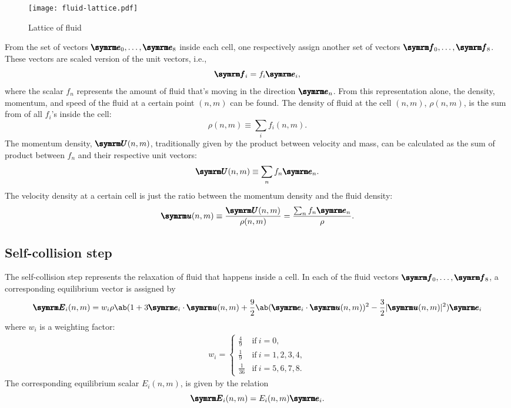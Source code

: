 \begin{figure}[ht]
	\centering
	\texttt{[image: fluid-lattice.pdf]}
	\caption{Lattice of fluid}
	\label{fig:fluid-lattice}
\end{figure}

From the set of vectors $\vv{e}_0, \dots, \vv{e}_8$ inside each cell, one respectively assign another set of vectors $\vv{f}_0, \dots, \vv{f}_8$. These vectors are scaled version of the unit vectors, i.e.,
\begin{equation}
	\vv{f}_i = f_i\vv{e}_i,
\end{equation}
where the scalar $f_n$ represents the amount of fluid that's moving in the direction $\vv{e}_n$. From this representation alone, the density, momentum, and speed of the fluid at a certain point $(n, m)$ can be found. The density of fluid at the cell $(n, m)$, $\rho(n, m)$, is the sum from of all $f_i$'s inside the cell:
\begin{equation}
	\rho(n, m) \equiv \sum_if_i(n, m).
\end{equation}
The momentum density, $\vv{U}(n, m)$, traditionally given by the product between velocity and mass, can be calculated as the sum of product between $f_n$ and their respective unit vectors:
\begin{equation}
	\vv{U}(n, m) \equiv \sum_nf_n\vv{e}_n.
\end{equation}
The velocity density at a certain cell is just the ratio between the momentum density and the fluid density:
\begin{equation}
	\vv{u}(n, m) \equiv \frac{\vv{U}(n, m)}{\rho(n, m)} = \frac{\sum_nf_n\vv{e}_n}{\rho}.
\end{equation}

\subsection{Self-collision step}

The self-collision step represents the relaxation of fluid that happens inside a cell. In each of the fluid vectors $\vv{f}_0,\dots,\vv{f}_8$, a corresponding equilibrium vector is assigned by
\begin{equation}
	\vv{E}_i(n, m) = w_i\rho\ab(1 + 3\vv{e}_i \cdot \vv{u}(n, m) + \frac{9}{2}\ab(\vv{e}_i \cdot \vv{u}(n, m))^2 - \frac{3}{2}|\vv{u}(n, m)|^2)\vv{e}_i
\end{equation}
where $w_i$ is a weighting factor:
\begin{gather}
	w_i = \begin{cases}
		\frac{4}{9}  & \textrm{if} ~ i = 0,          \\
		\frac{1}{9}  & \textrm{if} ~ i = 1, 2, 3, 4, \\
		\frac{1}{36} & \textrm{if} ~ i = 5, 6, 7, 8.
	\end{cases}
\end{gather}
The corresponding equilibrium scalar $E_i(n, m)$, is given by the relation
\begin{equation}
	\vv{E}_i(n, m) = E_i(n, m)\vv{e}_i.
\end{equation}

